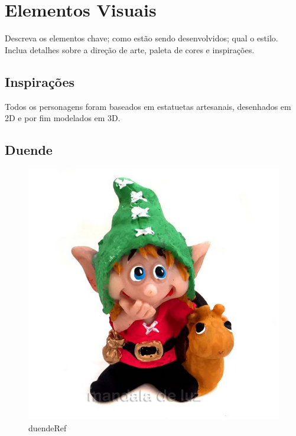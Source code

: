 
\section{Elementos Visuais}

Descreva os elementos chave; como estão sendo desenvolvidos; qual o estilo. Inclua detalhes sobre a direção de arte, paleta de cores e inspirações.

\subsection{Inspirações}
Todos os personagens foram baseados em estatuetas artesanais, desenhados em 2D e por fim modelados em 3D. 
\subsection{Duende}
\begin{figure}[htb]
	\caption{\label{duendeRef}duendeRef}
	\begin{center}
	    \includegraphics[width=\textwidth]{imagens/duendeRef.jpg}
	\end{center}
\end{figure}



